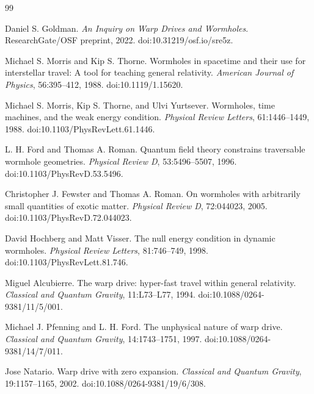 \documentclass[11pt]{article}
\begin{document}
\begin{thebibliography}{99}

Daniel S. Goldman.
\newblock \emph{An Inquiry on Warp Drives and Wormholes}.
\newblock ResearchGate/OSF preprint, 2022. doi:10.31219/osf.io/sre5z.

Michael S. Morris and Kip S. Thorne.
\newblock Wormholes in spacetime and their use for interstellar travel: A tool for teaching general relativity.
\newblock \emph{American Journal of Physics}, 56:395--412, 1988. doi:10.1119/1.15620.

Michael S. Morris, Kip S. Thorne, and Ulvi Yurtsever.
\newblock Wormholes, time machines, and the weak energy condition.
\newblock \emph{Physical Review Letters}, 61:1446--1449, 1988. doi:10.1103/PhysRevLett.61.1446.

L. H. Ford and Thomas A. Roman.
\newblock Quantum field theory constrains traversable wormhole geometries.
\newblock \emph{Physical Review D}, 53:5496--5507, 1996. doi:10.1103/PhysRevD.53.5496.

Christopher J. Fewster and Thomas A. Roman.
\newblock On wormholes with arbitrarily small quantities of exotic matter.
\newblock \emph{Physical Review D}, 72:044023, 2005. doi:10.1103/PhysRevD.72.044023.

David Hochberg and Matt Visser.
\newblock The null energy condition in dynamic wormholes.
\newblock \emph{Physical Review Letters}, 81:746--749, 1998. doi:10.1103/PhysRevLett.81.746.

Miguel Alcubierre.
\newblock The warp drive: hyper-fast travel within general relativity.
\newblock \emph{Classical and Quantum Gravity}, 11:L73--L77, 1994. doi:10.1088/0264-9381/11/5/001.

Michael J. Pfenning and L. H. Ford.
\newblock The unphysical nature of warp drive.
\newblock \emph{Classical and Quantum Gravity}, 14:1743--1751, 1997. doi:10.1088/0264-9381/14/7/011.

Jose Natario.
\newblock Warp drive with zero expansion.
\newblock \emph{Classical and Quantum Gravity}, 19:1157--1165, 2002. doi:10.1088/0264-9381/19/6/308.


\end{thebibliography}
\end{document}
